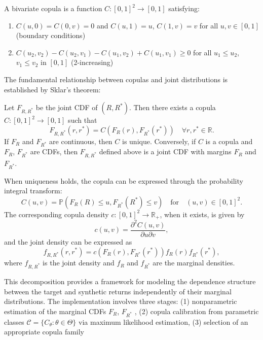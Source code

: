 \begin{definition}[Copula]
A bivariate copula is a function $C: [0,1]^2 \to [0,1]$ satisfying:
\begin{enumerate}
   \item $C(u,0) = C(0,v) = 0$ and $C(u,1) = u$, $C(1,v) = v$ for all $u,v \in [0,1]$ (boundary conditions)
   \item $C(u_2,v_2) - C(u_2,v_1) - C(u_1,v_2) + C(u_1,v_1) \geq 0$ for all $u_1 \leq u_2$, $v_1 \leq v_2$ in $[0,1]$ (2-increasing)
\end{enumerate}
\end{definition}

The fundamental relationship between copulas and joint distributions is established by Sklar's theorem:

\begin{theorem}[Sklar (1959)]
Let $F_{R,R^*}$ be the joint CDF of $(R,R^*)$. Then there exists a copula $C: [0,1]^2 \to [0,1]$ such that
\begin{equation}
   F_{R,R^*}(r,r^*) = C(F_R(r), F_{R^*}(r^*)) \quad \forall r,r^* \in \mathbb{R}.
\end{equation}
If $F_R$ and $F_{R^*}$ are continuous, then $C$ is unique. Conversely, if $C$ is a copula and $F_R$, $F_{R^*}$ are CDFs, then $F_{R,R^*}$ defined above is a joint CDF with margins $F_R$ and $F_{R^*}$.
\end{theorem}
%
When uniqueness holds, the copula can be expressed through the probability integral transform: 
$$
C(u,v) = \mathbb P( F_R(R) \leq u, F_{R^*}(R^*) \leq v) 
\quad \text{for} \quad
(u,v)\in[0,1]^2
.
$$
The corresponding copula density $c:[0,1]^2\to\mathbb R_+$, when it exists, is given by
\begin{equation*}
   c(u,v) = \frac{\partial^2 C(u,v)}{\partial u \partial v},
\end{equation*}
and the joint density can be expressed as
\begin{equation*}
   f_{R,R^*}(r,r^*) = c(F_R(r), F_{R^*}(r^*)) f_R(r)f_{R^*}(r^*),
\end{equation*}
where $f_{R,R^*}$ is the joint density and $f_R$ and $f_{R^*}$ are the marginal densities.

This decomposition provides a framework for modeling the dependence structure between the target and synthetic returns independently of their marginal distributions. The implementation involves three stages: (1) nonparametric estimation of the marginal CDFs $F_R$, $F_{R^*}$ , (2) copula calibration from parametric classes $\mathcal{C} = \{C_\theta : \theta \in \Theta\}$ via maximum likelihood estimation, (3) selection of an appropriate copula family 



